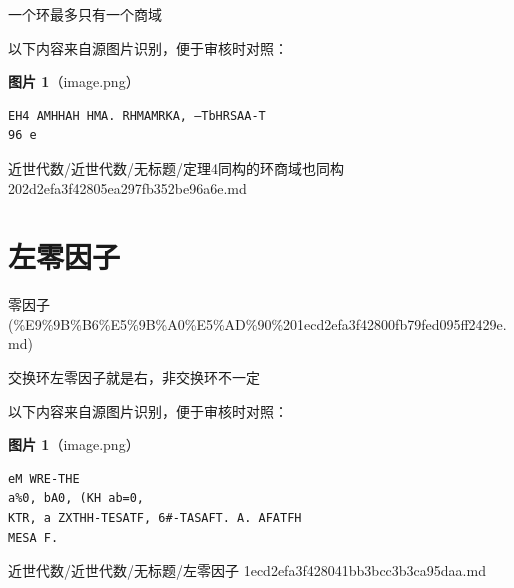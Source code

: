 \begin{theorem}[定理4同构的环商域也同构]

一个环最多只有一个商域

\end{theorem}

\begin{note}
以下内容来自源图片识别，便于审核时对照：

\textbf{图片 1}（image.png）
\begin{Verbatim}[fontsize=\small]
EH4 AMHHAH HMA. RHMAMRKA, —TbHRSAA-T
96 e
\end{Verbatim}

\end{note}

\begin{note}[来源路径]

近世代数/近世代数/无标题/定理4同构的环商域也同构 202d2efa3f42805ea297fb352be96a6e.md

\end{note}

\section*{左零因子}

\begin{note}[来源上级主题]

零因子 (\%E9\%9B\%B6\%E5\%9B\%A0\%E5\%AD\%90\%201ecd2efa3f42800fb79fed095ff2429e.md)

\end{note}

\begin{note}[左零因子]

交换环左零因子就是右，非交换环不一定

\end{note}

\begin{note}
以下内容来自源图片识别，便于审核时对照：

\textbf{图片 1}（image.png）
\begin{Verbatim}[fontsize=\small]
eM WRE-THE
a%0, bA0, (KH ab=0,
KTR, a ZXTHH-TESATF, 6#-TASAFT. A. AFATFH
MESA F.
\end{Verbatim}

\end{note}

\begin{note}[来源路径]

近世代数/近世代数/无标题/左零因子 1ecd2efa3f428041bb3bcc3b3ca95daa.md

\end{note}

